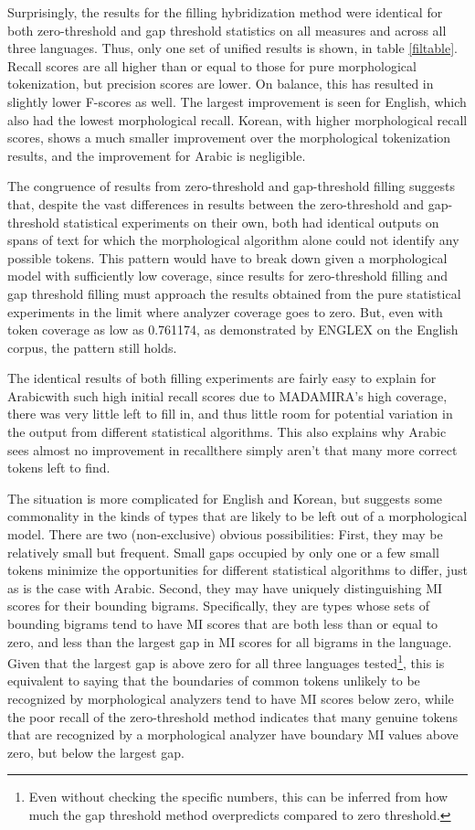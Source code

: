 Surprisingly, the results for the filling hybridization method were identical for both zero-threshold and gap threshold statistics on all measures and across all three languages. Thus, only one set of unified results is shown, in table \ref{filtable}. Recall scores are all higher than or equal to those for pure morphological tokenization, but precision scores are lower. On balance, this has resulted in slightly lower F-scores as well. The largest improvement is seen for English, which also had the lowest morphological recall. Korean, with higher morphological recall scores, shows a much smaller improvement over the morphological tokenization results, and the improvement for Arabic is negligible.

The congruence of results from zero-threshold and gap-threshold filling suggests that, despite the vast differences in results between the zero-threshold and gap-threshold statistical experiments on their own, both had identical outputs on spans of text for which the morphological algorithm alone could not identify any possible tokens. This pattern would have to break down given a morphological model with sufficiently low coverage, since results for zero-threshold filling and gap threshold filling must approach the results obtained from the pure statistical experiments in the limit where analyzer coverage goes to zero. But, even with token coverage as low as 0.761174, as demonstrated by ENGLEX on the English corpus, the pattern still holds.

The identical results of both filling experiments are fairly easy to explain for Arabic\textemdash with such high initial recall scores due to MADAMIRA's high coverage, there was very little left to fill in, and thus little room for potential variation in the output from different statistical algorithms. This also explains why Arabic sees almost no improvement in recall\textemdash there simply aren't that many more correct tokens left to find. 

The situation is more complicated for English and Korean, but suggests some commonality in the kinds of types that are likely to be left out of a morphological model. There are two (non-exclusive) obvious possibilities: First, they may be relatively small but frequent. Small gaps occupied by only one or a few small tokens minimize the opportunities for different statistical algorithms to differ, just as is the case with Arabic. Second, they may have uniquely distinguishing MI scores for their bounding bigrams. Specifically, they are types whose sets of bounding bigrams tend to have MI scores that are both less than or equal to zero, and less than the largest gap in MI scores for all bigrams in the language. Given that the largest gap is above zero for all three languages tested\footnote{Even without checking the specific numbers, this can be inferred from how much the gap threshold method overpredicts compared to zero threshold.}, this is equivalent to saying that the boundaries of common tokens unlikely to be recognized by morphological analyzers tend to have MI scores below zero, while the poor recall of the zero-threshold method indicates that many genuine tokens that are recognized by a morphological analyzer have boundary MI values above zero, but below the largest gap.

